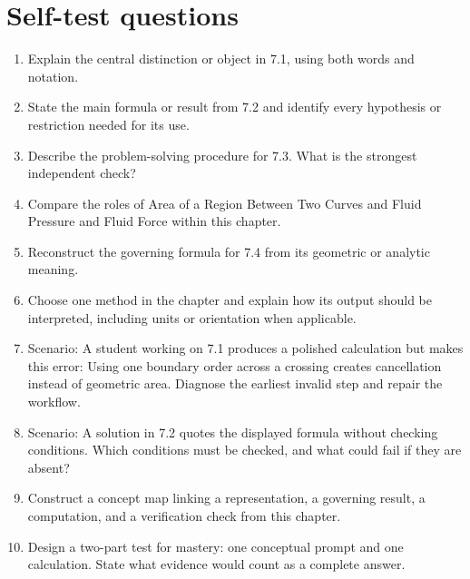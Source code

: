 \documentclass[11pt]{article}
\begin{document}
\section{Self-test questions}
\begin{enumerate}
\item Explain the central distinction or object in 7.1, using both words and notation.
\item State the main formula or result from 7.2 and identify every hypothesis or restriction needed for its use.
\item Describe the problem-solving procedure for 7.3. What is the strongest independent check?
\item Compare the roles of Area of a Region Between Two Curves and Fluid Pressure and Fluid Force within this chapter.
\item Reconstruct the governing formula for 7.4 from its geometric or analytic meaning.
\item Choose one method in the chapter and explain how its output should be interpreted, including units or orientation when applicable.
\item Scenario: A student working on 7.1 produces a polished calculation but makes this error: Using one boundary order across a crossing creates cancellation instead of geometric area. Diagnose the earliest invalid step and repair the workflow.
\item Scenario: A solution in 7.2 quotes the displayed formula without checking conditions. Which conditions must be checked, and what could fail if they are absent?
\item Construct a concept map linking a representation, a governing result, a computation, and a verification check from this chapter.
\item Design a two-part test for mastery: one conceptual prompt and one calculation. State what evidence would count as a complete answer.
\end{enumerate}

\end{document}
